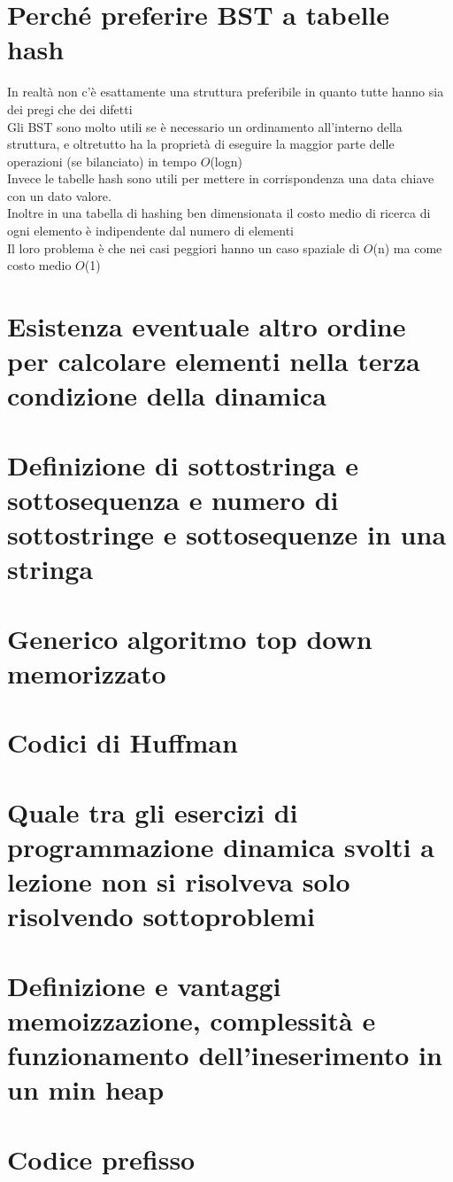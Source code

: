 \documentclass[12pt,oneside,a4paper]{article}
\newcommand\Omicron{O}
\begin{document}
\section{Perché preferire BST a tabelle hash}
In realtà non c'è esattamente una struttura preferibile in quanto tutte hanno sia dei pregi che dei difetti\\
Gli BST sono molto utili se è necessario un ordinamento all'interno della struttura, e oltretutto ha la proprietà di eseguire la maggior parte delle operazioni (se bilanciato) in tempo $\Omicron$(logn)\\
Invece le tabelle hash sono utili per mettere in corrispondenza una data chiave con un dato valore.\\
Inoltre in una tabella di hashing ben dimensionata il costo medio di ricerca di ogni elemento è indipendente dal numero di elementi\\
Il loro problema è che nei casi peggiori hanno un caso spaziale di $\Omicron$(n) ma come costo medio $\Omicron$(1)
\section{Esistenza eventuale altro ordine per calcolare elementi nella terza condizione della dinamica}
\section{Definizione di sottostringa e sottosequenza  e numero di sottostringe e sottosequenze in una stringa}
\section{Generico algoritmo top down memorizzato}
\section{Codici di Huffman}
\section{Quale tra gli esercizi di programmazione dinamica svolti a lezione non si risolveva solo risolvendo sottoproblemi}
\section{Definizione e vantaggi memoizzazione, complessità e funzionamento dell'ineserimento in un min heap}
\section{Codice prefisso}
\end{document}
